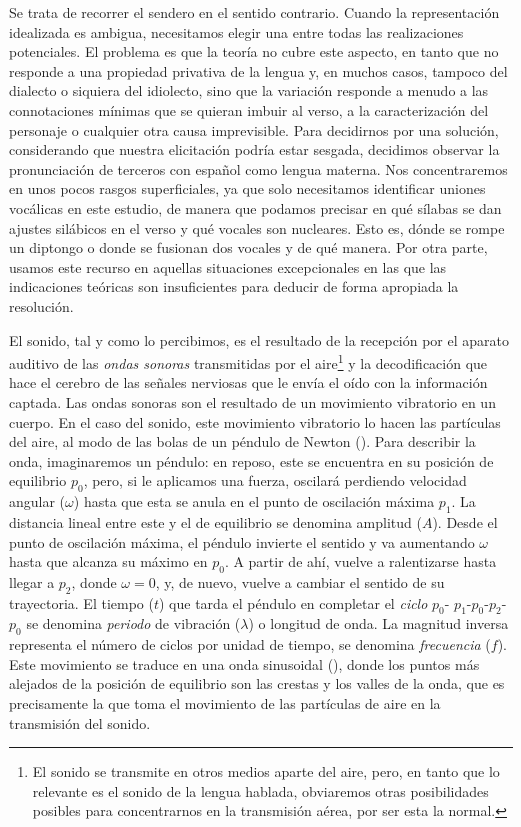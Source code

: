 Se trata de recorrer el sendero en el sentido contrario. Cuando la representación idealizada es ambigua, necesitamos elegir una entre todas las realizaciones potenciales. El problema es que la teoría no cubre este aspecto, en tanto que no responde a una propiedad privativa de la lengua y, en muchos casos, tampoco del dialecto o siquiera del idiolecto, sino que la variación responde a menudo a las connotaciones mínimas que se quieran imbuir al verso, a la caracterización del personaje o cualquier otra causa imprevisible. Para decidirnos por una solución, considerando que nuestra elicitación podría estar sesgada, decidimos observar la pronunciación de terceros con español como lengua materna. Nos concentraremos en unos pocos rasgos superficiales, ya que solo necesitamos identificar uniones vocálicas en este estudio, de manera que podamos precisar en qué sílabas se dan ajustes silábicos en el verso y qué vocales son nucleares. Esto es, dónde se rompe un diptongo o donde se fusionan dos vocales y de qué manera. Por otra parte, usamos este recurso en aquellas situaciones excepcionales en las que las indicaciones teóricas son insuficientes para deducir de forma apropiada la resolución.

El sonido, tal y como lo percibimos, es el resultado de la recepción por el aparato auditivo de las \textit{ondas sonoras} transmitidas por el aire\footnote{El sonido se transmite en otros medios aparte del aire, pero, en tanto que lo relevante es el sonido de la lengua hablada, obviaremos otras posibilidades posibles para concentrarnos en la transmisión aérea, por ser esta la normal.} y la decodificación que hace el cerebro de las señales nerviosas que le envía el oído con la información captada. Las ondas sonoras son el resultado de un movimiento vibratorio en un cuerpo. En el caso del sonido, este movimiento vibratorio lo hacen las partículas del aire, al modo de las bolas de un péndulo de Newton (). Para describir la onda, imaginaremos un péndulo: en reposo, este se encuentra en su posición de equilibrio $p_0$, pero, si le aplicamos una fuerza, oscilará perdiendo velocidad angular ($\omega$) hasta que esta se anula en el punto de oscilación máxima $p_1$. La distancia lineal entre este y el de equilibrio se denomina amplitud ($A$). Desde el punto de  oscilación máxima, el péndulo invierte el sentido y va aumentando $\omega$ hasta que alcanza su máximo en $p_0$. A partir de ahí, vuelve a ralentizarse hasta llegar a $p_2$, donde $\omega = 0$, y, de nuevo, vuelve a cambiar el sentido de su trayectoria. El tiempo ($t$) que tarda el péndulo en completar el \textit{ciclo} $p_0$- $p_1$-$p_0$-$p_2$-$p_0$ se denomina \textit{periodo} de vibración ($\lambda$) o longitud de onda. La magnitud inversa representa el número de ciclos por unidad de tiempo, se denomina \textit{frecuencia} ($f$). Este movimiento se traduce en una onda sinusoidal (), donde los puntos más alejados de la posición de equilibrio son las crestas y los valles de la onda, que es precisamente la que toma el movimiento de las partículas de aire en la transmisión del sonido.

